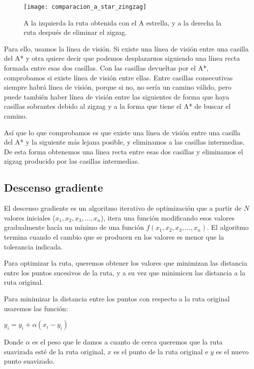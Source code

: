 \begin{figure}[!htpb]
    \centering
    \texttt{[image: comparacion\_a\_star\_zingzag]}
    \caption[Comparación entre la ruta del A estrella con y sin zigzag]{A la izquierda la ruta obtenida con el A estrella, y a la derecha la ruta después de eliminar el zigzag.}
    \label{fig:basics AFM sketch}
\end{figure}

Para ello, usamos la línea de visión. Si existe una línea de visión entre una casilla del A* y otra quiere decir que podemos desplazarnos siguiendo una línea recta formada entre esas dos casillas. Con las casillas devueltas por el A*, comprobamos si existe línea de visión entre ellas. Entre casillas consecutivas siempre habrá línea de visión, porque si no, no sería un camino válido, pero puede también haber línea de visión entre las siguientes de forma que haya casillas sobrantes debido al zigzag y a la forma que tiene el A* de buscar el camino.

Así que lo que comprobamos es que existe una línea de visión entre una casilla del A* y la siguiente más lejana posible, y eliminamos a las casillas intermedias. De esta forma obtenemos una línea recta entre esas dos casillas y eliminamos el zigzag producido por las casillas intermedias.

\subsection{Descenso gradiente}

El descenso gradiente es un algoritmo iterativo de optimización que a partir de $N$ valores iniciales ($x_1, x_2, x_3, ..., x_n$), itera una función modificando esos valores gradualmente hacía un mínimo de una función $f(x_1, x_2, x_3, ..., x_n)$. El algoritmo termina cuando el cambio que se producen en los valores es menor que la tolerancia indicada.

Para optimizar la ruta, queremos obtener los valores que minimizan las distancia entre los puntos sucesivos de la ruta, y a su vez que minimicen las distancia a la ruta original.

Para minimizar la distancia entre los puntos con respecto a la ruta original usaremos las función:
\begin{center}
$y_i = y_i + \alpha (x_i - y_i)$
\end{center}
Donde $\alpha$ es el peso que le damos a cuanto de cerca queremos que la ruta suavizada esté de la ruta original, $x$ es el punto de la ruta original e $y$ es el nuevo punto suavizado.

